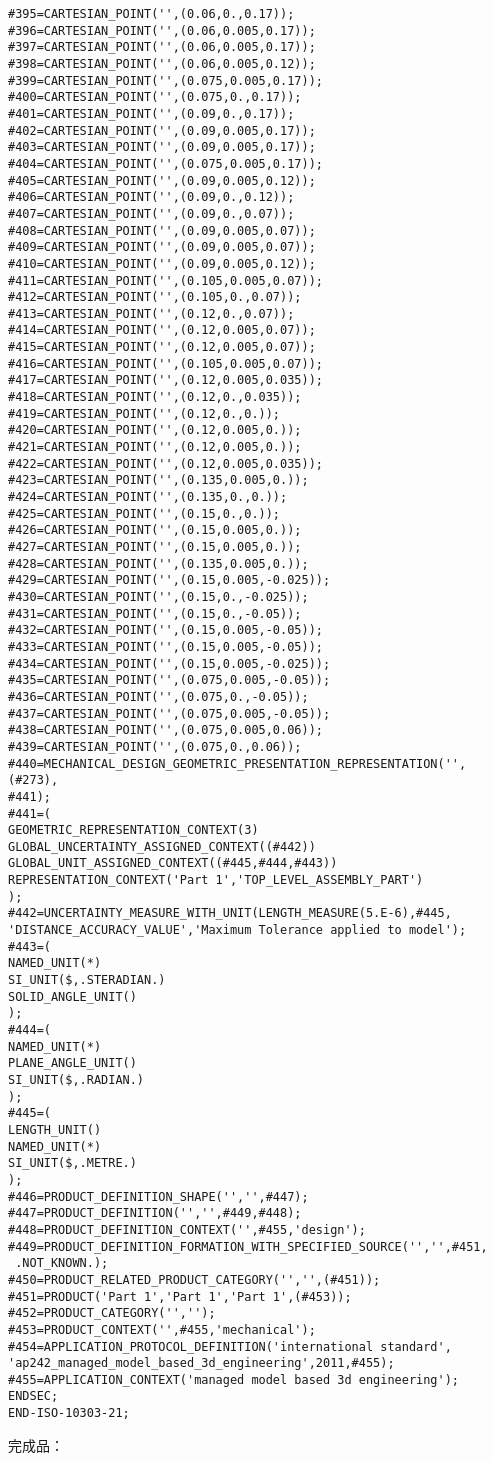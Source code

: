\documentclass[a4paper,12pt]{article}
\begin{document}
\begin{lstlising}[language=C++]
\begin{lstlisting}[language=STEP]
#395=CARTESIAN_POINT('',(0.06,0.,0.17));
#396=CARTESIAN_POINT('',(0.06,0.005,0.17));
#397=CARTESIAN_POINT('',(0.06,0.005,0.17));
#398=CARTESIAN_POINT('',(0.06,0.005,0.12));
#399=CARTESIAN_POINT('',(0.075,0.005,0.17));
#400=CARTESIAN_POINT('',(0.075,0.,0.17));
#401=CARTESIAN_POINT('',(0.09,0.,0.17));
#402=CARTESIAN_POINT('',(0.09,0.005,0.17));
#403=CARTESIAN_POINT('',(0.09,0.005,0.17));
#404=CARTESIAN_POINT('',(0.075,0.005,0.17));
#405=CARTESIAN_POINT('',(0.09,0.005,0.12));
#406=CARTESIAN_POINT('',(0.09,0.,0.12));
#407=CARTESIAN_POINT('',(0.09,0.,0.07));
#408=CARTESIAN_POINT('',(0.09,0.005,0.07));
#409=CARTESIAN_POINT('',(0.09,0.005,0.07));
#410=CARTESIAN_POINT('',(0.09,0.005,0.12));
#411=CARTESIAN_POINT('',(0.105,0.005,0.07));
#412=CARTESIAN_POINT('',(0.105,0.,0.07));
#413=CARTESIAN_POINT('',(0.12,0.,0.07));
#414=CARTESIAN_POINT('',(0.12,0.005,0.07));
#415=CARTESIAN_POINT('',(0.12,0.005,0.07));
#416=CARTESIAN_POINT('',(0.105,0.005,0.07));
#417=CARTESIAN_POINT('',(0.12,0.005,0.035));
#418=CARTESIAN_POINT('',(0.12,0.,0.035));
#419=CARTESIAN_POINT('',(0.12,0.,0.));
#420=CARTESIAN_POINT('',(0.12,0.005,0.));
#421=CARTESIAN_POINT('',(0.12,0.005,0.));
#422=CARTESIAN_POINT('',(0.12,0.005,0.035));
#423=CARTESIAN_POINT('',(0.135,0.005,0.));
#424=CARTESIAN_POINT('',(0.135,0.,0.));
#425=CARTESIAN_POINT('',(0.15,0.,0.));
#426=CARTESIAN_POINT('',(0.15,0.005,0.));
#427=CARTESIAN_POINT('',(0.15,0.005,0.));
#428=CARTESIAN_POINT('',(0.135,0.005,0.));
#429=CARTESIAN_POINT('',(0.15,0.005,-0.025));
#430=CARTESIAN_POINT('',(0.15,0.,-0.025));
#431=CARTESIAN_POINT('',(0.15,0.,-0.05));
#432=CARTESIAN_POINT('',(0.15,0.005,-0.05));
#433=CARTESIAN_POINT('',(0.15,0.005,-0.05));
#434=CARTESIAN_POINT('',(0.15,0.005,-0.025));
#435=CARTESIAN_POINT('',(0.075,0.005,-0.05));
#436=CARTESIAN_POINT('',(0.075,0.,-0.05));
#437=CARTESIAN_POINT('',(0.075,0.005,-0.05));
#438=CARTESIAN_POINT('',(0.075,0.005,0.06));
#439=CARTESIAN_POINT('',(0.075,0.,0.06));
#440=MECHANICAL_DESIGN_GEOMETRIC_PRESENTATION_REPRESENTATION('',(#273),
#441);
#441=(
GEOMETRIC_REPRESENTATION_CONTEXT(3)
GLOBAL_UNCERTAINTY_ASSIGNED_CONTEXT((#442))
GLOBAL_UNIT_ASSIGNED_CONTEXT((#445,#444,#443))
REPRESENTATION_CONTEXT('Part 1','TOP_LEVEL_ASSEMBLY_PART')
);
#442=UNCERTAINTY_MEASURE_WITH_UNIT(LENGTH_MEASURE(5.E-6),#445,
'DISTANCE_ACCURACY_VALUE','Maximum Tolerance applied to model');
#443=(
NAMED_UNIT(*)
SI_UNIT($,.STERADIAN.)
SOLID_ANGLE_UNIT()
);
#444=(
NAMED_UNIT(*)
PLANE_ANGLE_UNIT()
SI_UNIT($,.RADIAN.)
);
#445=(
LENGTH_UNIT()
NAMED_UNIT(*)
SI_UNIT($,.METRE.)
);
#446=PRODUCT_DEFINITION_SHAPE('','',#447);
#447=PRODUCT_DEFINITION('','',#449,#448);
#448=PRODUCT_DEFINITION_CONTEXT('',#455,'design');
#449=PRODUCT_DEFINITION_FORMATION_WITH_SPECIFIED_SOURCE('','',#451,
 .NOT_KNOWN.);
#450=PRODUCT_RELATED_PRODUCT_CATEGORY('','',(#451));
#451=PRODUCT('Part 1','Part 1','Part 1',(#453));
#452=PRODUCT_CATEGORY('','');
#453=PRODUCT_CONTEXT('',#455,'mechanical');
#454=APPLICATION_PROTOCOL_DEFINITION('international standard',
'ap242_managed_model_based_3d_engineering',2011,#455);
#455=APPLICATION_CONTEXT('managed model based 3d engineering');
ENDSEC;
END-ISO-10303-21;
\end{lstlisting}
完成品：
\bct\bfH\ctr{}\ef\FB\ect


\end{lstlising}
\end{document}
